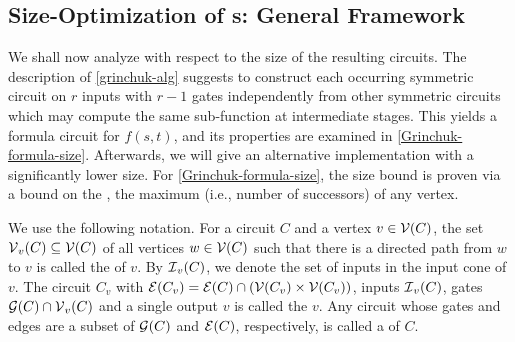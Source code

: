 \subsection{Size-Optimization of \AOP{}s: General Framework} \label{sec-grinchuk-size}

We shall now analyze  with respect to the
size of the resulting circuits.
The description of \cref{grinchuk-alg} suggests to construct each occurring symmetric circuit on $r$ inputs
with $r - 1$ gates
independently from other symmetric circuits which may compute the same sub-function at intermediate stages.
This yields a formula circuit for $f(s, t)$, and its properties are examined in \cref{Grinchuk-formula-size}.
Afterwards,
we will give an alternative implementation with a significantly lower size.
For \cref{Grinchuk-formula-size}, the size bound
is proven via a bound on the ,
the maximum 
(i.e., number of successors) of any vertex.

We use the following notation. For a circuit $C$ and a vertex $v \in \operatorname{\mathcal V}(C)$,
the set $\operatorname{\mathcal V}_v(C) \subseteq \operatorname{\mathcal V}(C)$\label{inputcone-page}
of all vertices $w \in \operatorname{\mathcal V}(C)$ such that there is a directed path
from $w$ to $v$ is called the  of $v$.
By $\operatorname{\mathcal I}_v(C)$,\label{inputconeinputs-page} we denote the set of inputs
in the input cone of $v$.
The circuit $C_v$ with $\operatorname{\mathcal E}(C_v) = \operatorname{\mathcal E}(C) \cap \left({\operatorname{\mathcal V}(C_v) \times \operatorname{\mathcal V}(C_v)}\right)$,
inputs $\operatorname{\mathcal I}_v(C)$, gates $\operatorname{\mathcal G}(C) \cap \operatorname{\mathcal V}_v(C)$
and a single output $v$ is called the  $v$.
Any circuit whose gates and edges are a subset of $\operatorname{\mathcal G}(C)$ and $\operatorname{\mathcal E}(C)$, respectively,
is called a  of $C$.

